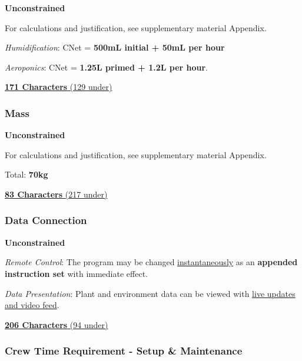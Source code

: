 \documentclass{report}
\begin{document}
\textbf{Unconstrained}

For calculations and justification, see supplementary material Appendix.

\textit{Humidification}: CNet = \textbf{500mL initial + 50mL per hour}

\textit{Aeroponics}: CNet = \textbf{1.25L primed + 1.2L per hour}.

\uline{\textbf{171 Characters} (129 under)}

\subsubsection{Mass} 
\label{sec:constraints-mass}

\textbf{Unconstrained}

For calculations and justification, see supplementary material Appendix.

Total: \textbf{70kg}

\uline{\textbf{83 Characters} (217 under)}


\subsubsection{Data Connection} 
\label{sec:constraints-data}

\textbf{Unconstrained}

\textit{Remote Control}: The program may be changed \uline{instantaneously} as an \textbf{appended instruction set} with immediate effect.

\textit{Data Presentation}: Plant and environment data can be viewed with \uline{live updates and video feed}.

\uline{\textbf{206 Characters} (94 under)}

\subsubsection{Crew Time Requirement - Setup \& Maintenance}
\label{sec:constraints-crewtime} 
\end{document}
